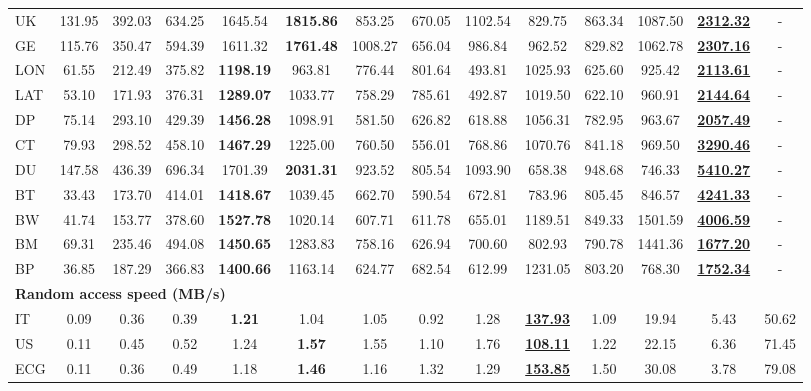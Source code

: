 \begin{sidewaystable}
\begin{tabular}{@{}l *{13}{c}@{}}
UK & 131.95 & 392.03 & 634.25 & 1645.54 & \textbf{1815.86} & 853.25 & 670.05 & 1102.54 & 829.75 & 863.34 & 1087.50 & \underline{\textbf{2312.32}} & - \\
GE & 115.76 & 350.47 & 594.39 & 1611.32 & \textbf{1761.48} & 1008.27 & 656.04 & 986.84 & 962.52 & 829.82 & 1062.78 & \underline{\textbf{2307.16}} & - \\
LON & 61.55 & 212.49 & 375.82 & \textbf{1198.19} & 963.81 & 776.44 & 801.64 & 493.81 & 1025.93 & 625.60 & 925.42 & \underline{\textbf{2113.61}} & - \\
LAT & 53.10 & 171.93 & 376.31 & \textbf{1289.07} & 1033.77 & 758.29 & 785.61 & 492.87 & 1019.50 & 622.10 & 960.91 & \underline{\textbf{2144.64}} & - \\
DP & 75.14 & 293.10 & 429.39 & \textbf{1456.28} & 1098.91 & 581.50 & 626.82 & 618.88 & 1056.31 & 782.95 & 963.67 & \underline{\textbf{2057.49}} & - \\
CT & 79.93 & 298.52 & 458.10 & \textbf{1467.29} & 1225.00 & 760.50 & 556.01 & 768.86 & 1070.76 & 841.18 & 969.50 & \underline{\textbf{3290.46}} & - \\
DU & 147.58 & 436.39 & 696.34 & 1701.39 & \textbf{2031.31} & 923.52 & 805.54 & 1093.90 & 658.38 & 948.68 & 746.33 & \underline{\textbf{5410.27}} & - \\
BT & 33.43 & 173.70 & 414.01 & \textbf{1418.67} & 1039.45 & 662.70 & 590.54 & 672.81 & 783.96 & 805.45 & 846.57 & \underline{\textbf{4241.33}} & - \\
BW & 41.74 & 153.77 & 378.60 & \textbf{1527.78} & 1020.14 & 607.71 & 611.78 & 655.01 & 1189.51 & 849.33 & 1501.59 & \underline{\textbf{4006.59}} & - \\
BM & 69.31 & 235.46 & 494.08 & \textbf{1450.65} & 1283.83 & 758.16 & 626.94 & 700.60 & 802.93 & 790.78 & 1441.36 & \underline{\textbf{1677.20}} & - \\
BP & 36.85 & 187.29 & 366.83 & \textbf{1400.66} & 1163.14 & 624.77 & 682.54 & 612.99 & 1231.05 & 803.20 & 768.30 & \underline{\textbf{1752.34}} & - \\
\midrule
\multicolumn{14}{l}{\textbf{Random access speed (MB/s)}} \\
\midrule
IT & 0.09 & 0.36 & 0.39 & \textbf{1.21} & 1.04 & 1.05 & 0.92 & 1.28 & \underline{\textbf{137.93}} & 1.09 & 19.94 & 5.43 & 50.62 \\
US & 0.11 & 0.45 & 0.52 & 1.24 & \textbf{1.57} & 1.55 & 1.10 & 1.76 & \underline{\textbf{108.11}} & 1.22 & 22.15 & 6.36 & 71.45 \\
ECG & 0.11 & 0.36 & 0.49 & 1.18 & \textbf{1.46} & 1.16 & 1.32 & 1.29 & \underline{\textbf{153.85}} & 1.50 & 30.08 & 3.78 & 79.08 \\

\end{tabular}
\end{sidewaystable}
